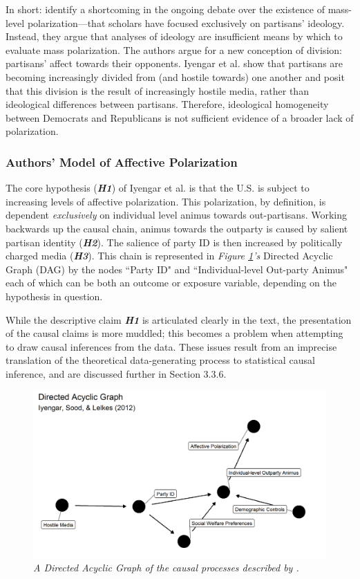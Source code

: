 \documentclass[12pt]{article}
\begin{document}
In short: \citeauthor{iyengar2012affect} identify a shortcoming in the ongoing debate over the existence of mass-level polarization---that scholars have focused exclusively on partisans' ideology. Instead, they argue that analyses of ideology are insufficient means by which to evaluate mass polarization. The authors argue for a new conception of division: partisans' affect towards their opponents. Iyengar et al. show that partisans are becoming increasingly divided from (and hostile towards) one another and posit that this division is the result of increasingly hostile media, rather than ideological differences between partisans. Therefore, ideological homogeneity between Democrats and Republicans is not sufficient evidence of a broader lack of polarization.



\subsubsection{Authors' Model of Affective Polarization}
The core hypothesis (\textit{\textbf{H1}}) of Iyengar et al. is that the U.S. is subject to increasing levels of affective polarization. This polarization, by definition, is dependent \textit{exclusively} on individual level animus towards out-partisans. Working backwards up the causal chain, animus towards the outparty is caused by salient partisan identity (\textit{\textbf{H2}}). The salience of party ID is then increased by politically charged media (\textit{\textbf{H3}}). This chain is represented in \textit{Figure \ref{fig:dag}'s} Directed Acyclic Graph (DAG) by the nodes ``Party ID" and ``Individual-level Out-party Animus" each of which can be both an outcome or exposure variable, depending on the hypothesis in question.

While the descriptive claim \textbf{\textit{H1}} is articulated clearly in the text, the presentation of the causal claims is more muddled; this becomes a problem when attempting to draw causal inferences from the data. These issues result from an imprecise translation of the theoretical data-generating process to statistical causal inference, and are discussed further in Section 3.3.6.

\begin{figure}[h!]
\center\includegraphics[width=6in]{ext-dag.png}
\caption{\label{fig:dag}\textit{A Directed Acyclic Graph of the causal processes described by \citeauthor{iyengar2012affect}.}}
\end{figure}
\end{document}
